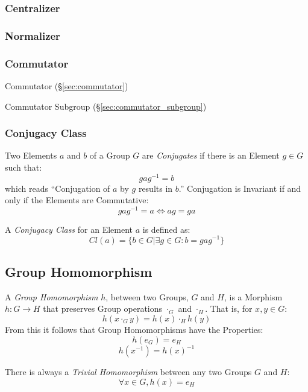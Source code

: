 \subsubsection{Centralizer}\label{sec:group_centralizer}

\subsubsection{Normalizer}\label{sec:group_normalizer}

\subsubsection{Commutator}\label{sec:group_commutator}

Commutator (\S\ref{sec:commutator})

Commutator Subgroup (\S\ref{sec:commutator_subgroup})



\subsubsection{Conjugacy Class}\label{sec:conjugacy_class}

Two Elements $a$ and $b$ of a Group $G$ are \emph{Conjugates} if there
is an Element $g \in G$ such that:
\[
    gag^{-1} = b
\]
which reads ``Conjugation of $a$ by $g$ results in $b$.'' Conjugation
is Invariant if and only if the Elements are Commutative:
\[
    gag^{-1} = a \Leftrightarrow ag = ga
\]

A \emph{Conjugacy Class} for an Element $a$ is defined as:
\[
    Cl(a) = \{ b \in G | \exists g \in G : b = gag^{-1}\}
\]



\subsection{Group Homomorphism}\label{sec:group_homomorphism}

A \emph{Group Homomorphism} $h$, between two Groups, $G$ and $H$, is a
Morphism $h : G \rightarrow H$ that preserves Group operations
$\cdot_G$ and $\cdot_H$. That is, for $x,y \in G$:
\[
    h(x \cdot_G y) = h(x) \cdot_H h(y)
\]
From this it follows that Group Homomorphisms have the Properties:
\[
    h(e_G) = e_H
\]\[
    h(x^{-1}) = h(x)^{-1}
\]

There is always a \emph{Trivial Homomorphism} between any two Groups
$G$ and $H$:
\[
    \forall x \in G, h (x) = e_H
\]

